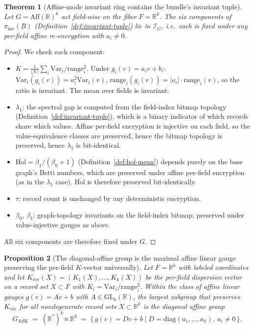 \documentclass[11pt,letterpaper]{article}
\newtheorem{theorem}{Theorem}[section]
\newtheorem{proposition}[theorem]{Proposition}
\begin{document}
\begin{theorem}[Affine-mode invariant ring contains the bundle's invariant tuple]
\label{thm:affine-invariants}
Let $G = \mathrm{Aff}(\mathbb{R})^k$ act field-wise on the fiber
$F = \mathbb{R}^k$. The six components of $\pi_{\mathrm{inv}}(B)$
(Definition~\ref{def:invariant-tuple}) lie in
$\mathcal{I}_G$, i.e.~each is fixed under any per-field affine
re-encryption with $a_i \neq 0$.
\end{theorem}

\begin{proof}
We check each component:
\begin{itemize}[nosep]
\item $K = \frac{1}{|\mathcal{N}|}\sum_i \mathrm{Var}_i / \mathrm{range}_i^2$.
  Under $g_i(v) = a_i v + b_i$: $\mathrm{Var}_i(g_i(v)) = a_i^2 \mathrm{Var}_i(v)$,
  $\mathrm{range}_i(g_i(v)) = |a_i| \cdot \mathrm{range}_i(v)$, so the
  ratio is invariant. The mean over fields is invariant.
\item $\lambda_1$: the spectral gap is computed from the field-index
  bitmap topology (Definition~\ref{def:invariant-tuple}), which is a
  binary indicator of which records share which values. Affine
  per-field encryption is injective on each field, so the
  value-equivalence classes are preserved, hence the bitmap topology
  is preserved, hence $\lambda_1$ is bit-identical.
\item $\overline{\mathrm{Hol}} = \beta_1 / (\beta_0 + 1)$
  (Definition~\ref{def:hol-mean}) depends purely on the base graph's
  Betti numbers, which are preserved under affine per-field encryption
  (as in the $\lambda_1$ case). $\overline{\mathrm{Hol}}$ is therefore
  preserved bit-identically.
\item $\tau$: record count is unchanged by any deterministic
  encryption.
\item $\beta_0$, $\beta_1$: graph-topology invariants on the
  field-index bitmap; preserved under value-injective gauges as above.
\end{itemize}
All six components are therefore fixed under $G$.
\end{proof}

\begin{proposition}[The diagonal-affine group is the maximal affine linear gauge preserving the per-field $K$-vector universally]
\label{prop:k-preserving}
Let $F = \mathbb{R}^k$ with labeled coordinates and let
$K_{\mathrm{vec}}(X) = (K_1(X), \ldots, K_k(X))$ be the per-field
dispersion vector on a record set $X \subset F$ with
$K_i = \mathrm{Var}_i / \mathrm{range}_i^2$. Within the class of
affine linear gauges $g(v) = Av + b$ with $A \in
\mathrm{GL}_k(\mathbb{R})$, the largest subgroup that preserves
$K_{\mathrm{vec}}$ for \emph{all} nondegenerate record sets
$X \subset \mathbb{R}^k$ is the diagonal affine group
\[
G_{\mathrm{AffK}} \;=\; (\mathbb{R}^*)^k \ltimes \mathbb{R}^k
\;=\; \{\,g(v) = D v + b \mid D = \mathrm{diag}(a_1, \ldots, a_k),\ a_i \neq 0\,\}.
\]
\end{proposition}
\end{document}
